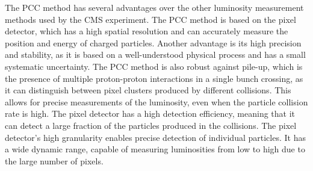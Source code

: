 The PCC method has several advantages over the other luminosity measurement methods used by the CMS experiment. The PCC method is based on the pixel detector, which has a high spatial resolution and can accurately measure the position and energy of charged particles. Another advantage is its high precision and stability, as it is based on a well-understood physical process and has a small systematic uncertainty. %
The PCC method is also robust against pile-up, which is the presence of multiple proton-proton interactions in a single bunch crossing, as it can distinguish between pixel clusters produced by different collisions. %
This allows for precise measurements of the luminosity, even when the particle collision rate is high. The pixel detector has a high detection efficiency, meaning that it can detect a large fraction of the particles produced in the collisions. The pixel detector's high granularity enables precise detection of individual particles. %
It has a wide dynamic range, capable of measuring luminosities from low to high due to the large number of pixels.


